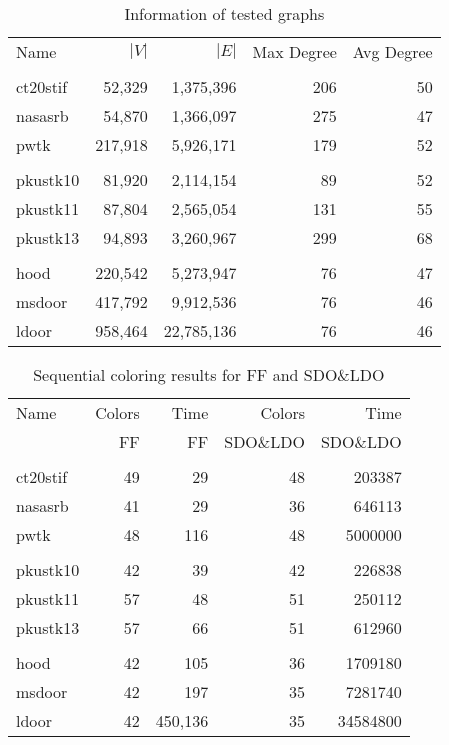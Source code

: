 \documentclass[preprint]{sigplanconf}
\begin{document}
\begin{table}
\scriptsize
\begin{center}
\begin{tabular}{l r r r r}
\hline
Name & $|V|$ & $|E|$ & Max Degree & Avg Degree \\
\\
\hline
ct20stif & 52,329 & 1,375,396 & 206 & 50 \\
nasasrb & 54,870 & 1,366,097 & 275 & 47 \\
pwtk  & 217,918 & 5,926,171 & 179 & 52 \\
\\
pkustk10 & 81,920 & 2,114,154 & 89 & 52 \\
pkustk11 & 87,804 & 2,565,054 & 131 & 55 \\
pkustk13 & 94,893 & 3,260,967 & 299 & 68\\
\\
hood & 220,542 & 5,273,947 & 76  & 47 \\
msdoor & 417,792 & 9,912,536 & 76 & 46 \\
ldoor & 958,464 & 22,785,136 & 76 & 46 \\

\end{tabular}
\caption{Information of tested graphs}
\label{amean_time}
\end{center}
\end{table}


\begin{table}
\scriptsize
\begin{center}
\begin{tabular}{l r r r r}
\hline
Name & Colors  & Time  & Colors & Time \\
 & FF & FF &   SDO$\&$LDO &  SDO$\&$LDO\\
\\
\hline
ct20stif & 49 & 29 & 48 & 203387 \\
nasasrb & 41 & 29 & 36 & 646113 \\
pwtk  & 48 & 116 & 48 & 5000000 \\
\\
pkustk10 & 42 & 39 & 42 & 226838 \\
pkustk11 & 57 & 48 & 51 & 250112 \\
pkustk13 & 57 & 66 & 51 & 612960\\
\\
hood & 42 & 105 & 36  & 1709180 \\
msdoor & 42 & 197 & 35 & 7281740 \\
ldoor & 42 & 450,136 & 35 & 34584800 \\

\end{tabular}
\caption{Sequential coloring results for FF and SDO$\&$LDO}
\label{amean_time}
\end{center}
\end{table}
\end{document}
